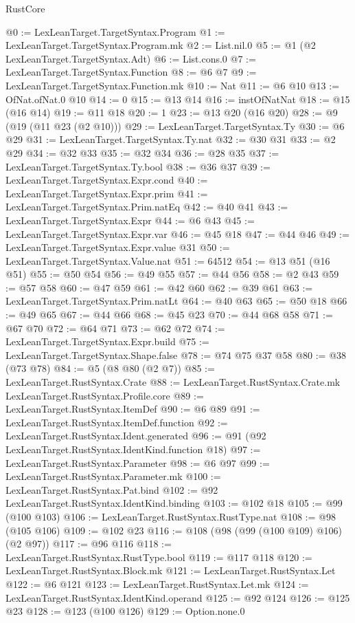 \begin{lexlean}{RustCore}
\begin{coremodule}
@0 := LexLeanTarget.TargetSyntax.Program
@1 := LexLeanTarget.TargetSyntax.Program.mk
@2 := List.nil.{0}
@5 := @1 (@2 LexLeanTarget.TargetSyntax.Adt)
@6 := List.cons.{0}
@7 := LexLeanTarget.TargetSyntax.Function
@8 := @6 @7
@9 := LexLeanTarget.TargetSyntax.Function.mk
@10 := Nat
@11 := @6 @10
@13 := OfNat.ofNat.{0} @10
@14 := 0
@15 := @13 @14
@16 := instOfNatNat
@18 := @15 (@16 @14)
@19 := @11 @18
@20 := 1
@23 := @13 @20 (@16 @20)
@28 := @9 (@19 (@11 @23 (@2 @10)))
@29 := LexLeanTarget.TargetSyntax.Ty
@30 := @6 @29
@31 := LexLeanTarget.TargetSyntax.Ty.nat
@32 := @30 @31
@33 := @2 @29
@34 := @32 @33
@35 := @32 @34
@36 := @28 @35
@37 := LexLeanTarget.TargetSyntax.Ty.bool
@38 := @36 @37
@39 := LexLeanTarget.TargetSyntax.Expr.cond
@40 := LexLeanTarget.TargetSyntax.Expr.prim
@41 := LexLeanTarget.TargetSyntax.Prim.natEq
@42 := @40 @41
@43 := LexLeanTarget.TargetSyntax.Expr
@44 := @6 @43
@45 := LexLeanTarget.TargetSyntax.Expr.var
@46 := @45 @18
@47 := @44 @46
@49 := LexLeanTarget.TargetSyntax.Expr.value @31
@50 := LexLeanTarget.TargetSyntax.Value.nat
@51 := 64512
@54 := @13 @51 (@16 @51)
@55 := @50 @54
@56 := @49 @55
@57 := @44 @56
@58 := @2 @43
@59 := @57 @58
@60 := @47 @59
@61 := @42 @60
@62 := @39 @61
@63 := LexLeanTarget.TargetSyntax.Prim.natLt
@64 := @40 @63
@65 := @50 @18
@66 := @49 @65
@67 := @44 @66
@68 := @45 @23
@70 := @44 @68 @58
@71 := @67 @70
@72 := @64 @71
@73 := @62 @72
@74 := LexLeanTarget.TargetSyntax.Expr.build
@75 := LexLeanTarget.TargetSyntax.Shape.false
@78 := @74 @75 @37 @58
@80 := @38 (@73 @78)
@84 := @5 (@8 @80 (@2 @7))
@85 := LexLeanTarget.RustSyntax.Crate
@88 := LexLeanTarget.RustSyntax.Crate.mk LexLeanTarget.RustSyntax.Profile.core
@89 := LexLeanTarget.RustSyntax.ItemDef
@90 := @6 @89
@91 := LexLeanTarget.RustSyntax.ItemDef.function
@92 := LexLeanTarget.RustSyntax.Ident.generated
@96 := @91 (@92 LexLeanTarget.RustSyntax.IdentKind.function @18)
@97 := LexLeanTarget.RustSyntax.Parameter
@98 := @6 @97
@99 := LexLeanTarget.RustSyntax.Parameter.mk
@100 := LexLeanTarget.RustSyntax.Pat.bind
@102 := @92 LexLeanTarget.RustSyntax.IdentKind.binding
@103 := @102 @18
@105 := @99 (@100 @103)
@106 := LexLeanTarget.RustSyntax.RustType.nat
@108 := @98 (@105 @106)
@109 := @102 @23
@116 := @108 (@98 (@99 (@100 @109) @106) (@2 @97))
@117 := @96 @116
@118 := LexLeanTarget.RustSyntax.RustType.bool
@119 := @117 @118
@120 := LexLeanTarget.RustSyntax.Block.mk
@121 := LexLeanTarget.RustSyntax.Let
@122 := @6 @121
@123 := LexLeanTarget.RustSyntax.Let.mk
@124 := LexLeanTarget.RustSyntax.IdentKind.operand
@125 := @92 @124
@126 := @125 @23
@128 := @123 (@100 @126)
@129 := Option.none.{0}

\end{coremodule}
\end{lexlean}
